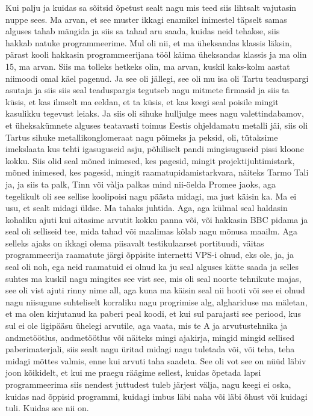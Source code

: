 Kui palju ja kuidas sa sõitsid õpetust sealt nagu mis teed siis lihtsalt vajutasin nuppe sees. Ma arvan, et see muster ikkagi enamikel inimestel täpselt samas alguses tahab mängida ja siis sa tahad aru saada, kuidas neid tehakse, siis hakkab natuke programmeerime. Mul oli nii, et ma üheksandas klassis läksin, pärast kooli hakkasin programmeerijana tööl käima üheksandas klassis ja ma olin 15, ma arvan. Siis ma tolleks hetkeks olin, ma arvan, kuskil kaks-kolm aastat niimoodi omal käel pagenud. Ja see oli jällegi, see oli mu isa oli Tartu teaduspargi asutaja ja siis siis seal teaduspargis tegutseb nagu mitmete firmasid ja siis ta küsis, et kas ilmselt ma eeldan, et ta küsis, et kas keegi seal poisile mingit kasulikku tegevust leiaks. Ja siis oli sihuke hulljulge mees nagu valettindabamov, et üheksakümnete alguses teatavasti toimus Eestis ohjeldamatu metalli jäi, siis oli Tartus sihuke metallikonglomeraat nagu põimeks ja peksid, oli, tütaksime imekslaata kus tehti igasuguseid asju, põhiliselt pandi mingisuguseid pissi kloone kokku. Siis olid seal mõned inimesed, kes pagesid, mingit projektijuhtimistark, mõned inimesed, kes pagesid, mingit raamatupidamistarkvara, näiteks Tarmo Tali ja, ja siis ta palk, Tinn või vàlja palkas mind nii-öelda Promee jaoks, aga tegelikult oli see sellise koolipoisi nagu päästa midagi, ma just käisin ka. Ma ei usu, et sealt midagi üldse. Ma tahaks juhtida. Aga, aga külmal seal haldasin kohaliku ajuti kui aitasime arvutit kokku panna või, või hakkasin BBC pidama ja seal oli selliseid tee, mida tahad või maalimas kõlab nagu mõnusa maailm. Aga selleks ajaks on ikkagi olema piisavalt testikulaarset portituudi, väitas programmeerija raamatute järgi õppisite internetti VPS-i olnud, eks ole, ja, ja seal oli noh, ega neid raamatuid ei olnud ka ju seal alguses kätte saada ja selles suhtes ma kuskil nagu mingites see vist see, mis oli seal noorte tehnikute majas, see oli vist ajuti rinny nime all, aga kuna ma käisin seal nii hooti või see ei olnud nagu niisugune suhteliselt korraliku nagu progrimise alg, alghariduse ma mäletan, et ma olen kirjutanud ka paberi peal koodi, et kui sul parajasti see periood, kus sul ei ole ligipääsu ühelegi arvutile, aga vaata, mis te A ja arvutustehnika ja andmetöötlus, andmetöötlus või näiteks mingi ajakirja, mingid mingid sellised paberimaterjali, siis sealt nagu üritad midagi nagu tuletada või, või teha, teha midagi mõttes valmis, enne kui arvuti taha saadeta. See oli vot see on nüüd läbiv joon kõikidelt, et kui me praegu räägime sellest, kuidas õpetada lapsi programmeerima siis nendest juttudest tuleb järjest välja, nagu keegi ei oska, kuidas nad õppisid programmi, kuidagi imbus läbi naha või läbi õhust või kuidagi tuli. Kuidas see nii on.
